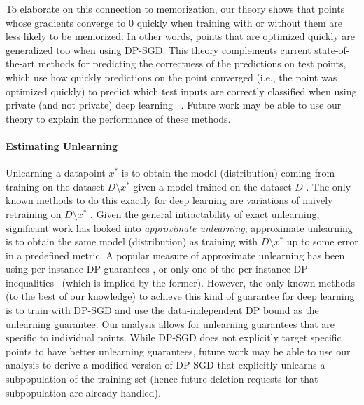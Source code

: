 To elaborate on this connection to memorization, our theory shows that points whose gradients converge to $0$ quickly when training with or without them are less likely to be memorized. In other words, points that are optimized quickly are generalized too when using DP-SGD. This theory complements current state-of-the-art methods for predicting the correctness of the predictions on test points, which use how quickly predictions on the point converged (i.e., the point was optimized quickly) to predict which test inputs are correctly classified when using private (and not private) deep learning ~\cite{rabanser2022selective, rabanser2023training}. Future work may be able to use our theory to explain the performance of these methods.



\paragraph{Estimating Unlearning} Unlearning a datapoint $x^*$ is to obtain the model (distribution) coming from training on the dataset $D\setminus x^*$ given a model trained on the dataset $D$ \cite{cao2015towards}. The only known methods to do this exactly for deep learning are variations of naively retraining on $D \setminus x^*$ \cite{bourtoule2021machine}. Given the general intractability of exact unlearning, significant work has looked into \emph{approximate unlearning}; approximate unlearning is to obtain the same model (distribution) as training with $D \setminus x^*$ up to some error in a predefined metric. A popular measure of approximate unlearning has been using per-instance DP guarantees \cite{guo2019certified}, or only one of the per-instance DP inequalities~\cite{gupta2021adaptive}\cite{ginart2019making} (which is implied by the former). However, the only known methods (to the best of our knowledge) to achieve this kind of guarantee for deep learning is to train with DP-SGD and use the data-independent DP bound as the unlearning guarantee. Our analysis allows for unlearning guarantees that are specific to individual points. While DP-SGD does not explicitly target specific points to have better unlearning guarantees, future work may be able to use our analysis to derive a modified version of DP-SGD that explicitly unlearns a subpopulation of the training set (hence future deletion requests for that subpopulation are already handled). 




